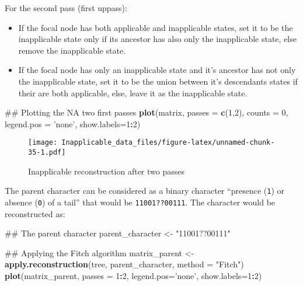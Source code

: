 \documentclass[]{book}
\newenvironment{Shaded}{\begin{snugshade}}{\end{snugshade}}
\newcommand{\KeywordTok}[1]{\textcolor[rgb]{0.13,0.29,0.53}{\textbf{#1}}}
\newcommand{\DataTypeTok}[1]{\textcolor[rgb]{0.13,0.29,0.53}{#1}}
\newcommand{\DecValTok}[1]{\textcolor[rgb]{0.00,0.00,0.81}{#1}}
\newcommand{\StringTok}[1]{\textcolor[rgb]{0.31,0.60,0.02}{#1}}
\newcommand{\OperatorTok}[1]{\textcolor[rgb]{0.81,0.36,0.00}{\textbf{#1}}}
\newcommand{\NormalTok}[1]{#1}
\providecommand{\tightlist}{%
  \setlength{\itemsep}{0pt}\setlength{\parskip}{0pt}}
\theoremstyle{definition}
\theoremstyle{definition}
\theoremstyle{definition}
\theoremstyle{remark}
\begin{document}
For the second pass (first uppass):

\begin{itemize}
\tightlist
\item
  If the focal node has both applicable and inapplicable states, set it
  to be the inapplicable state only if its ancestor has also only the
  inapplicable state, else remove the inapplicable state.
\item
  If the focal node has only an inapplicable state and it's ancestor has
  not only the inapplicable state, set it to be the union between it's
  descendants states if their are both applicable, else, leave it as the
  inapplicable state.
\end{itemize}

\begin{Shaded}
\begin{Highlighting}[]
\NormalTok{## Plotting the NA two first passes}
\KeywordTok{plot}\NormalTok{(matrix, }\DataTypeTok{passes =} \KeywordTok{c}\NormalTok{(}\DecValTok{1}\NormalTok{,}\DecValTok{2}\NormalTok{), }\DataTypeTok{counts =} \DecValTok{0}\NormalTok{, }
     \DataTypeTok{legend.pos =} \StringTok{'none'}\NormalTok{, }\DataTypeTok{show.labels=}\DecValTok{1}\OperatorTok{:}\DecValTok{2}\NormalTok{)}
\end{Highlighting}
\end{Shaded}

\begin{figure}
\centering
\texttt{[image: Inapplicable\_data\_files/figure-latex/unnamed-chunk-35-1.pdf]}
\caption{\label{fig:unnamed-chunk-35}Inapplicable reconstruction after two
passes}
\end{figure}

The parent character can be considered as a binary character ``presence
(\texttt{1}) or absence (\texttt{0}) of a tail'' that would be
\texttt{11001??00111}. The character would be reconstructed as:

\begin{Shaded}
\begin{Highlighting}[]
\NormalTok{## The parent character}
\NormalTok{parent_character <-}\StringTok{ "11001??00111"}

\NormalTok{## Applying the Fitch algorithm}
\NormalTok{matrix_parent <-}\StringTok{ }\KeywordTok{apply.reconstruction}\NormalTok{(tree, parent_character, }\DataTypeTok{method =} \StringTok{"Fitch"}\NormalTok{)}
\KeywordTok{plot}\NormalTok{(matrix_parent, }\DataTypeTok{passes =} \DecValTok{1}\OperatorTok{:}\DecValTok{2}\NormalTok{, }\DataTypeTok{legend.pos=}\StringTok{'none'}\NormalTok{, }\DataTypeTok{show.labels=}\DecValTok{1}\OperatorTok{:}\DecValTok{2}\NormalTok{)}
\end{Highlighting}
\end{Shaded}
\end{document}

